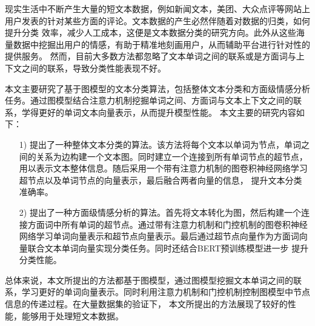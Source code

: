 	
\begin{chineseabstract}
现实生活中不断产生大量的短文本数据，例如新闻文本，美团、大众点评等网站上用户发表的针对某些方面的评论。文本数据的产生必然伴随着对数据的归类，如何提升分类
效率，减少人工成本，这便是文本数据分类的研究方向。此外从这些海量数据中挖掘出用户的情感，有助于精准地刻画用户，从而辅助平台进行针对性的提供服务。
然而，目前大多数方法都忽略了文本单词之间的联系或是方面词与上下文之间的联系，导致分类性能表现不好。

本文主要研究了基于图模型的文本分类算法，包括整体文本分类和方面级情感分析任务。通过图模型结合注意力机制挖掘单词之间、方面词与文本上下文之间的联系，学得更好的单词文本向量表示，从而提升模型性能。
本文主要的研究内容如下：

\begin{itemize}
    \item [1)] 
    提出了一种整体文本分类的算法。该方法将每个文本以单词为节点，单词之间的关系为边构建一个文本图。同时建立一个连接到所有单词节点的超节点，用以表示文本整体信息。随后采用一个带有注意力机制的图卷积神经网络学习超节点以及单词节点的向量表示，最后融合两者向量的信息，
    提升文本分类准确率。
    \item [2)] 
    提出了一种方面级情感分析的算法。首先将文本转化为图，然后构建一个连接方面词中所有单词的超节点。通过带有注意力机制和门控机制的图卷积神经网络学习单词向量表示和超节点向量表示。最后通过超节点向量作为方面词向量联合文本单词向量实现分类任务。同时还结合BERT预训练模型进一步
    提升分类性能。
\end{itemize}

总体来说，本文所提出的方法都基于图模型，通过图模型挖掘文本单词之间的联系，学习更好的单词向量表示。同时利用注意力机制和门控机制控制图模型中节点信息的传递过程。在大量数据集的验证下，
本文所提出的方法展现了较好的性能，能够用于处理短文本数据。

\end{chineseabstract}

